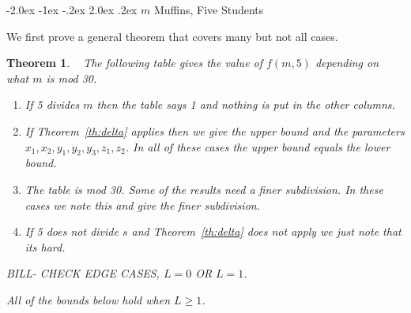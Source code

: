 \documentclass[12pt]{article}
\makeatletter
\renewcommand\section{\@startsection{section}{1}{\z@}%
                                  {-2.0ex \@plus -1ex \@minus -.2ex}%
                                  {2.0ex \@plus.2ex}%
                                  {\normalfont\normalsize\bfseries}}
\newtheorem{theoremfoo}{Theorem}[section] %
\newenvironment{theorem}{\pagebreak[1]\begin{theoremfoo}}{\end{theoremfoo}}
\makeatother
\begin{document}
\section{$m$ Muffins, Five Students}

We first prove a general theorem that covers many but not all cases.

\begin{theorem}~
The following table gives the value of $f(m,5)$ depending
on what $m$ is mod 30.  
\begin{enumerate}
\item
If 5 divides $m$ then the table says 1 and nothing is put in the other columns.
\item
If Theorem~\ref{th:delta} applies then we give the upper bound and the
parameters $x_1,x_2,y_1,y_2,y_3,z_1,z_2$. In all of these cases
the upper bound equals the lower bound.
\item
The table is mod 30. Some of the results need a finer subdivision. In these cases
we note this and give the finer subdivision.
\item
If 5 does not divide $s$ and Theorem~\ref{th:delta} does not apply we
just note that its hard.
\end{enumerate}

BILL- CHECK EDGE CASES, $L=0$ OR $L=1$.

All of the bounds below hold when $L\ge 1$.

\vfill\eject


\end{theorem}
\end{document}
